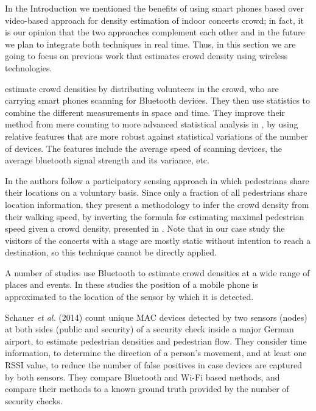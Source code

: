 \documentclass[10pt,a4paper]{article}
\begin{document}
In the Introduction we mentioned the benefits of using smart phones based over video-based approach for density estimation of indoor concerts crowd; in fact, it is our opinion that the two approaches complement each other and in the future we plan to integrate both techniques in real time. Thus, in this section we are going to focus on previous work that estimates crowd density using wireless technologies. 

\cite{weppner:1} estimate crowd densities by distributing volunteers in the crowd, who are carrying smart phones scanning for Bluetooth devices. They then use statistics to combine the different measurements in space and time. They improve their method from mere counting to more advanced statistical analysis in \cite{weppner:2}, by using relative features that are more robust
against statistical variations of the number of devices. The features include 
the average speed of scanning devices, the average bluetooth signal strength and its variance, etc.

In  \cite{wirz:2} the authors follow a participatory sensing approach in which pedestrians share their locations on
a voluntary basis. Since  only a fraction of
all pedestrians share location information, they present a methodology to infer the crowd density from their walking speed, by inverting the formula for estimating maximal pedestrian speed given a crowd density, presented in \cite{Johannsson}. Note that in our case study the visitors of the concerts with a stage are mostly static without intention to reach a destination, so this technique cannot be directly applied. 



A number of studies use Bluetooth to estimate crowd densities at a wide range of places and events.
In these studies the position of a mobile phone is approximated to the location of the sensor by which it is detected.

Schauer \textit{et al.} (2014) \cite{schauer:1} count unique MAC devices detected by two sensors (nodes) at both sides (public and security) of a security check inside a major German airport, to estimate pedestrian densities and pedestrian flow. They consider time information, to determine the direction of a person's movement, and at least one RSSI value, to reduce the number of false positives in case devices are captured by both sensors. They compare Bluetooth and Wi-Fi based methods, and compare their methods to a known ground truth provided by the number of security checks.
\end{document}
